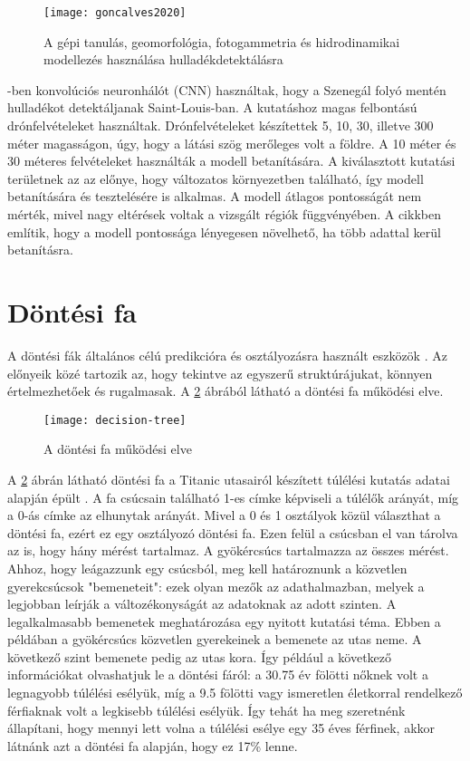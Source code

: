 \begin{figure}[H]
	\centering
	\texttt{[image: goncalves2020]}
	\caption{A gépi tanulás, geomorfológia, fotogammetria és hidrodinamikai modellezés használása hulladékdetektálásra \cite{Goncalves2020}}
    \label{fig:goncalves2020-method}
\end{figure}

\cite{Youme2021}-ben konvolúciós neuronhálót (CNN) használtak, hogy a Szenegál folyó mentén hulladékot detektáljanak Saint-Louis-ban. A kutatáshoz magas felbontású drónfelvételeket használtak. Drónfelvételeket készítettek 5, 10, 30, illetve 300 méter magasságon, úgy, hogy a látási szög merőleges volt a földre. A 10 méter és 30 méteres felvételeket használták a modell betanítására. A kiválasztott kutatási területnek az az előnye, hogy változatos környezetben található, így modell betanítására és tesztelésére is alkalmas. A modell átlagos pontosságát nem mérték, mivel nagy eltérések voltak a vizsgált régiók függvényében. A cikkben említik, hogy a modell pontossága lényegesen növelhető, ha több adattal kerül betanításra. 

\section{Döntési fa}
\label{ch:decision-tree}

A döntési fák általános célú predikcióra és osztályozásra használt eszközök \cite{deville2013}. Az előnyeik közé tartozik az, hogy tekintve az egyszerű struktúrájukat, könnyen értelmezhetőek és rugalmasak. A \ref{fig:decision-tree} ábrából látható a döntési fa működési elve.

\begin{figure}[H]
	\centering
	\texttt{[image: decision-tree]}
	\caption{A döntési fa működési elve \cite{deville2013}}
    \label{fig:decision-tree}
\end{figure}

A \ref{fig:decision-tree} ábrán látható döntési fa a Titanic utasairól készített túlélési kutatás adatai alapján épült \cite{Harrell2013}. A fa csúcsain található 1-es címke képviseli a túlélők arányát, míg a 0-ás címke az elhunytak arányát. Mivel a 0 és 1 osztályok közül választhat a döntési fa, ezért ez egy osztályozó döntési fa. Ezen felül a csúcsban el van tárolva az is, hogy hány mérést tartalmaz. A gyökércsúcs tartalmazza az összes mérést. Ahhoz, hogy leágazzunk egy csúcsból, meg kell határoznunk a közvetlen gyerekcsúcsok "bemeneteit": ezek olyan mezők az adathalmazban, melyek a legjobban leírják a változékonyságát az adatoknak az adott szinten. A legalkalmasabb bemenetek meghatározása egy nyitott kutatási téma. Ebben a példában a gyökércsúcs közvetlen gyerekeinek a bemenete az utas neme. A következő szint bemenete pedig az utas kora. Így például a következő információkat olvashatjuk le a döntési fáról: a 30.75 év fölötti nőknek volt a legnagyobb túlélési esélyük, míg a 9.5 fölötti vagy ismeretlen életkorral rendelkező férfiaknak volt a legkisebb túlélési esélyük. Így tehát ha meg szeretnénk állapítani, hogy mennyi lett volna a túlélési esélye egy 35 éves férfinek, akkor látnánk azt a döntési fa alapján, hogy ez 17\% lenne.

